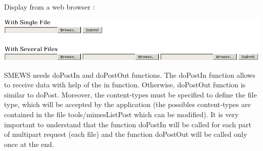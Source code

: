 \documentclass{report}
\begin{document}
Display from a web browser :
\begin{center}
\includegraphics[width=15cm]{files}
\end{center}

SMEWS needs doPostIn and doPostOut functions. The doPostIn function allows to receive data with help of the in function. Otherwise, doPostOut function is similar to doPost. Moreover, the content-types must be specified to define the file type, which will be accepted by the application (the possibles content-types are contained in the file tools/mimesListPost which can be modified). It is very important to understand that the function doPostIn will be called for each part of multipart request (each file) and the function doPostOut will be called only once at the end.
\end{document}
